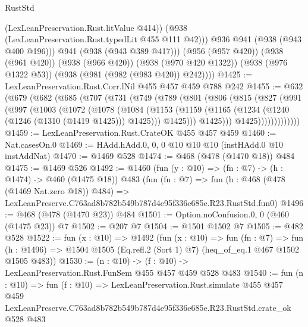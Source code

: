 \begin{lexlean}{RustStd}
\begin{coremodule}
                (LexLeanPreservation.Rust.litValue @414))
              (@938 (LexLeanPreservation.Rust.typedLit @455 @111 @42)))
            @936
            @941
            (@938 (@943 @400 @196)))
          @941
          (@938 (@943 @389 @417)))
        (@956 (@957 @420))
        (@938 (@961 @420))
        (@938 (@966 @420))
        (@938 (@970 @420 @1322))
        (@938 (@976 @1322 @53))
        (@938 (@981 (@982 (@983 @420)) @242))))
@1425 := LexLeanPreservation.Rust.Corr.lNil @455 @457 @459 @788 @242
@1455 := @632
    (@679
      (@682
        (@685
          (@707
            (@731
              (@749
                (@789
                  (@801
                    (@806
                      (@815
                        (@827
                          (@991
                            (@997
                              (@1003
                                (@1072
                                  (@1078
                                    (@1084
                                      (@1153
                                        (@1159
                                          (@1165
                                            (@1234 (@1240 (@1246 (@1310 (@1419 @1425))) @1425)))
                                          @1425)))
                                    @1425)))
                              @1425)))))))))))))
@1459 := LexLeanPreservation.Rust.CrateOK @455 @457 @459
@1460 := Nat.casesOn.{0}
@1469 := HAdd.hAdd.{0, 0, 0} @10 @10 @10 (instHAdd.{0} @10 instAddNat)
@1470 := @1469 @528
@1474 := @468 (@478 (@1470 @18)) @484
@1475 := @1469 @526
@1492 := @1460
    (fun (y : @10) => (fn : @7) -> (h : @1474) -> @460 (@1475 @18))
    @483
    (fun (fn : @7) =>
    fun (h : @468 (@478 (@1469 Nat.zero @18)) @484) =>
    LexLeanPreserve.C763ad8b782b549b787d4e95f336e685e.R23.RustStd.fun0)
@1496 := @468 (@478 (@1470 @23)) @484
@1501 := Option.noConfusion.{0, 0} (@460 (@1475 @23)) @7
@1502 := @207 @7
@1504 := @1501 @1502 @7
@1505 := @482 @528
@1522 := fun (x : @10) =>
  @1492
    (fun (x : @10) =>
    fun (fn : @7) =>
    fun (h : @1496) => @1504 @1505 (Eq.refl.{2} (Sort 1) @7) (heq_of_eq.{1} @467 @1502 @1505 @483))
@1530 := (n : @10) -> (f : @10) -> LexLeanPreservation.Rust.FunSem @455 @457 @459 @528 @483
@1540 := fun (n : @10) =>
  fun (f : @10) =>
  LexLeanPreservation.Rust.simulate
    @455
    @457
    @459
    LexLeanPreserve.C763ad8b782b549b787d4e95f336e685e.R23.RustStd.crate_ok
    @528
    @483
\end{coremodule}
\end{lexlean}
